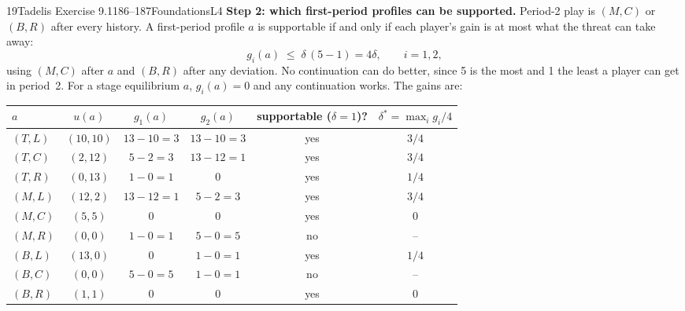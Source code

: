 \begin{exsol}{19}{Tadelis Exercise 9.1}{186--187}{Foundations}{L4}
\textbf{Step 2: which first-period profiles can be supported.} Period-2 play is $(M,C)$ or
$(B,R)$ after every history. A first-period profile $a$ is supportable if and only if each player's
gain is at most what the threat can take away:
\begin{equation}
  g_i(a) \;\le\; \delta\,(5 - 1) = 4\delta, \qquad i = 1, 2, \label{eq:19ic}
\end{equation}
using $(M,C)$ after $a$ and $(B,R)$ after any deviation. No continuation can do better, since 5 is
the most and 1 the least a player can get in period~2. For a stage equilibrium $a$, $g_i(a) = 0$
and any continuation works. The gains are:
\begin{center}
\small
\begin{tabular}{lccccc}
\toprule
$a$ & $u(a)$ & $g_1(a)$ & $g_2(a)$ & supportable ($\delta=1$)? & $\delta^* = \max_i g_i/4$\\
\midrule
$(T,L)$ & $(10,10)$ & $13-10=3$ & $13-10=3$ & yes & $3/4$ \\
$(T,C)$ & $(2,12)$ & $5-2=3$ & $13-12=1$ & yes & $3/4$ \\
$(T,R)$ & $(0,13)$ & $1-0=1$ & $0$ & yes & $1/4$ \\
$(M,L)$ & $(12,2)$ & $13-12=1$ & $5-2=3$ & yes & $3/4$ \\
$(M,C)$ & $(5,5)$ & $0$ & $0$ & yes & $0$ \\
$(M,R)$ & $(0,0)$ & $1-0=1$ & $5-0=5$ & no & -- \\
$(B,L)$ & $(13,0)$ & $0$ & $1-0=1$ & yes & $1/4$ \\
$(B,C)$ & $(0,0)$ & $5-0=5$ & $1-0=1$ & no & -- \\
$(B,R)$ & $(1,1)$ & $0$ & $0$ & yes & $0$ \\
\bottomrule
\end{tabular}
\end{center}


\end{exsol}
